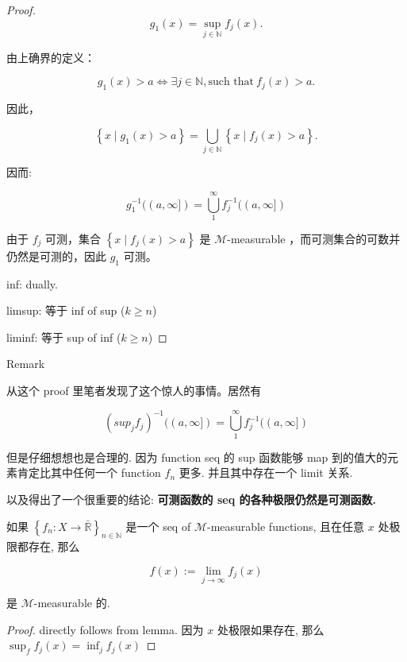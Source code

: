 \begin{proof}

\[g_{1}(x) = \sup\limits_{j \in \mathbb{N}}f_{j}(x).\]

由上确界的定义：

\[g_{1}(x) > a\Leftrightarrow\exists j \in \mathbb{N},\text{such that}\ f_{j}(x) > a.\]

因此，

\[\left\{ {x \mid g_{1}(x) > a} \right\} = \bigcup\limits_{j \in \mathbb{N}}\left\{ {x \mid f_{j}(x) > a} \right\}.\]

因而:

\[g_{1}^{- 1}((a,\infty\rbrack) = \bigcup\limits_{1}^{\infty}f_{j}^{- 1}((a,\infty\rbrack)\]

由于 \(f_{j}\) 可测，集合 \(\left\{ {x \mid f_{j}(x) > a} \right\}\) 是 \(\mathcal{M}\)-measurable ，而可测集合的可数并仍然是可测的，因此 \(g_{1}\) 可测。

inf: dually.

limsup: 等于 inf of sup (\(k \geq n\))

liminf: 等于 sup of inf (\(k \geq n\))

\end{proof}

\begin{qlremark}{Remark}

从这个 proof 里笔者发现了这个惊人的事情。居然有

\[(sup_{j}f_{j})^{- 1}((a,\infty\rbrack) = \bigcup\limits_{1}^{\infty}f_{j}^{- 1}((a,\infty\rbrack)\]

但是仔细想想也是合理的. 因为 function seq 的 sup 函数能够 map 到的值大的元素肯定比其中任何一个 function \(f_{n}\) 更多. 并且其中存在一个 limit 关系.

以及得出了一个很重要的结论: \textbf{可测函数的 seq 的各种极限仍然是可测函数.}

\end{qlremark}

\begin{corollary}

如果 \(\left\{ {f_{n}:X\rightarrow\bar{\mathbb{R}}} \right\}_{n \in \mathbb{N}}\) 是一个 seq of \(\mathcal{M}\)-measurable functions, 且在任意 \(x\) 处极限都存在, 那么

\[f(x) := \lim\limits_{j\rightarrow\infty}f_{j}(x)\]

是 \(\mathcal{M}\)-measurable 的.

\end{corollary}

\begin{proof}

directly follows from lemma. 因为 \(x\) 处极限如果存在, 那么 \(\sup_{f}f_{j}(x) = \inf_{j}f_{j}(x)\)

\end{proof}

